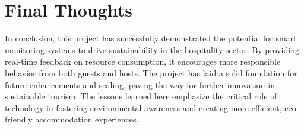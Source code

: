 \section{Final Thoughts}

In conclusion, this project has successfully demonstrated the potential for smart monitoring systems to drive 
sustainability in the hospitality sector. By providing real-time feedback on resource consumption, it encourages more 
responsible behavior from both guests and hosts. The project has laid a solid foundation for future enhancements and 
scaling, paving the way for further innovation in sustainable tourism. The lessons learned here emphasize the critical 
role of technology in fostering environmental awareness and creating more efficient, eco-friendly accommodation 
experiences.